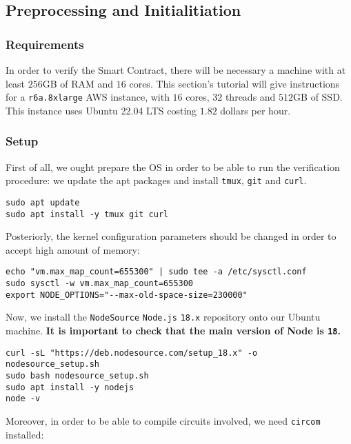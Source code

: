 \subsection{Preprocessing and Initialitiation}


\subsubsection{Requirements}

In order to verify the Smart Contract, there will be necessary a machine with at least $256$GB of RAM and $16$ cores. This section's tutorial will give instructions for a \texttt{r6a.8xlarge} AWS instance, with $16$ cores, $32$ threads and $512$GB of SSD. This instance uses Ubuntu 22.04 LTS costing $1.82$ dollars per hour. 


\subsubsection{Setup}

First of all, we ought prepare the OS in order to be able to run the verification procedure: we update the apt packages and install \texttt{tmux}, \texttt{git} and \texttt{curl}.

\begin{lstlisting}[style=termt]
sudo apt update
sudo apt install -y tmux git curl
\end{lstlisting}

Posteriorly, the kernel configuration parameters should be changed in order to accept high amount of memory:

\begin{lstlisting}[style=termt]
echo "vm.max_map_count=655300" | sudo tee -a /etc/sysctl.conf
sudo sysctl -w vm.max_map_count=655300
export NODE_OPTIONS="--max-old-space-size=230000"
\end{lstlisting}

Now, we install the \texttt{NodeSource} \texttt{Node.js} \texttt{18.x} repository onto our Ubuntu machine. \textbf{It is important to check that the main version of Node is \texttt{18}. }

\begin{lstlisting}[style=termt]
curl -sL "https://deb.nodesource.com/setup_18.x" -o nodesource_setup.sh
sudo bash nodesource_setup.sh
sudo apt install -y nodejs
node -v
\end{lstlisting}

Moreover, in order to be able to compile circuits involved, we need \texttt{circom} installed: 

